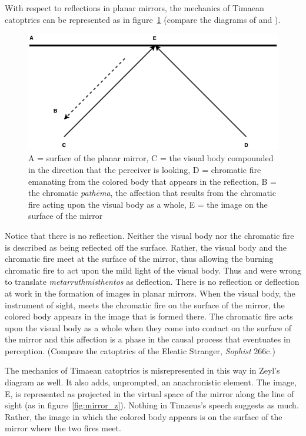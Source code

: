 With respect to reflections in planar mirrors, the mechanics of Timaean catoptrics can be represented as in figure~\ref{fig:mirror} (compare the diagrams of \citealt[160 n1]{Archer-Hind:1888qd} and \citealt[155]{Cornford:1935fk}).
\begin{figure}[htbp]
	\centering
		\includegraphics[scale=.4]{graphics/mirror.png}
	\caption{A = surface of the planar mirror, C = the visual body compounded in the direction that the perceiver is looking, D = chromatic fire emanating from the colored body that appears in the reflection, B = the chromatic \emph{pathēma}, the affection that results from the chromatic fire acting upon the visual body as a whole, E = the image on the surface of the mirror}
	\label{fig:mirror}
\end{figure}
Notice that there is no reflection. Neither the visual body nor the chromatic fire is described as being reflected off the surface. Rather, the visual body and the chromatic fire meet at the surface of the mirror, thus allowing the burning chromatic fire to act upon the mild light of the visual body. Thus \citet[159]{Archer-Hind:1888qd} and \citet[103]{Bury:1929jb} were wrong to translate \emph{metarruthmisthentos} as deflection. There is no reflection or deflection at work in the formation of images in planar mirrors. When the visual body, the instrument of sight, meets the chromatic fire on the surface of the mirror, the colored body appears in the image that is formed there. The chromatic fire acts upon the visual body as a whole when they come into contact on the surface of the mirror and this affection is a phase in the causal process that eventuates in perception. (Compare the catoptrics of the Eleatic Stranger, \emph{Sophist} 266c.) 

The mechanics of Timaean catoptrics is misrepresented in this way in Zeyl's \citeyearpar[34 n 45]{Zeyl:2000cs} diagram as well. It also adds, unprompted, an anachronistic element. The image, E, is represented as projected in the virtual space of the mirror along the line of sight (as in figure~\ref{fig:mirror_z}). Nothing in Timaeus's speech suggests as much. Rather, the image in which the colored body appears is on the surface of the mirror where the two fires meet.

